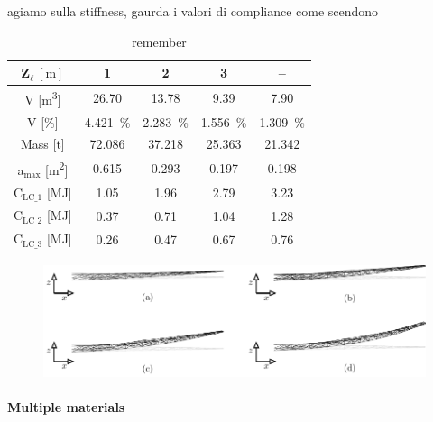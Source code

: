 agiamo sulla stiffness, gaurda i valori di compliance come scendono

\begin{table}
    \small
    \centering
    \begin{tabular}{ccccc}
    \toprule
    $\bm{Z}_\ell\:[\text{m}]$ & 1&2&3&--\\ \midrule
    V [\unit{\meter^3}]&  26.70&13.78&9.39&7.90\\
    V [\unit{\%}]&   \qty{4.421}{\%}   & \qty{2.283}{\%}&\qty{1.556}{\%}&\qty{1.309}{\%}  \\
    Mass [\unit{\tonne}]  &72.086&37.218&25.363&21.342\\
    a$_{\text{max}}$ [\unit{\meter^2}]&  0.615    & 0.293&0.197&0.198\\
    C$_\text{LC\_1}$ [\unit{\mega \joule}]   &  1.05    &  1.96&2.79& 3.23\\
    C$_\text{LC\_2}$ [\unit{\mega \joule}]   &   0.37   &  0.71&1.04& 1.28\\
    C$_\text{LC\_3}$ [\unit{\mega \joule}]   &   0.26   &  0.47&0.67& 0.76\\

    \bottomrule
    \end{tabular}
    \caption{remember }
    \label{tab:07_disp}
\end{table}

\begin{figure}
    \centering
    \includegraphics[width=\linewidth]{figures/07_aeronautic/00_dispalcements/disp.pdf}
     \caption{}
    \label{fig:07_disp_sol}
\end{figure}

\paragraph{Multiple materials}

